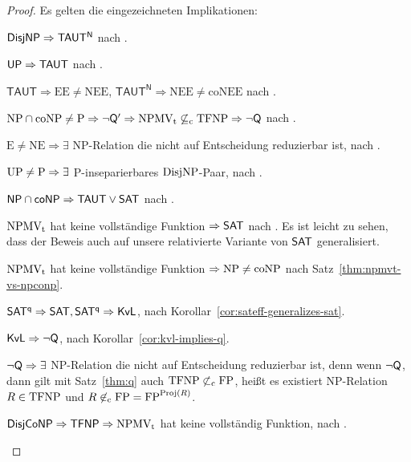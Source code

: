 \begin{proof}
    Es gelten die eingezeichneten Implikationen:
    \begin{Prooflist}[noitemsep,midpenalty=0, label={\arabic*.},labelsep=3pt]
\item $\mathsf{DisjNP} \Rightarrow \mathsf{TAUT^N}$ nach \textcite[Cor.~6.1]{kobler_optimal_2003}.
\item $\mathsf{UP} \Rightarrow \mathsf{TAUT}$ nach \textcite[Cor.~4.1]{kobler_optimal_2003}. %
\item $\mathsf{TAUT}\Rightarrow \mathrm{EE\neq NEE}$, $\mathsf{TAUT^N}\Rightarrow \mathrm{NEE\neq coNEE}$ nach \textcite[Cor.~7.1]{kobler_optimal_2003}.
\item $\mathrm{NP}\cap\mathrm{coNP}\neq \mathrm{P} \Rightarrow \neg\mathsf{Q}' \Rightarrow \mathrm{NPMV_t} \not\subseteq_\mathrm{c} \mathrm{TFNP} \Rightarrow \neg\mathsf{Q}$ nach \textcite[Prop.~9, Thm. 6]{fenner_inverting_2003}.
\item $\mathrm{E\neq NE}\Rightarrow \exists$ NP-Relation die nicht auf Entscheidung reduzierbar ist, nach \textcite{impagliazzo_1991}.
\item $\mathrm{UP}\neq\mathrm{P} \Rightarrow \exists$ P-inseparierbares $\mathrm{DisjNP}$-Paar, nach \textcite[Thm.~5]{grollmann_complexity_1988}.
\item $\mathsf{NP}{}\cap{}\mathsf{coNP}\Rightarrow \mathsf{TAUT}\lor\mathsf{SAT}$ nach \textcite[Cor.~5.1]{kobler_optimal_2003}. %
\item $\mathrm{NPMV_t}$ hat keine vollständige Funktion $\Rightarrow \mathsf{SAT}$ nach \textcite[Thm.~25]{beyersdorff_nondeterministic_2009}. Es ist leicht zu sehen, dass der Beweis auch auf unsere relativierte Variante von $\mathsf{SAT}$ generalisiert.
\item $\mathrm{NPMV_t}$ hat keine vollständige Funktion $\Rightarrow \mathrm{NP}\neq\mathrm{coNP}$ nach Satz~\ref{thm:npmvt-vs-npconp}.
\item $\mathsf{SAT^{q}} \Rightarrow \mathsf{SAT}, \mathsf{SAT^{q}}\Rightarrow \mathsf{KvL}$, nach Korollar~\ref{cor:sateff-generalizes-sat}.
\item $\mathsf{KvL}\Rightarrow\neg\mathsf{Q}$, nach Korollar~\ref{cor:kvl-implies-q}.
\item $\neg\mathsf{Q}\Rightarrow \exists$ NP-Relation die nicht auf Entscheidung reduzierbar ist, denn wenn $\neg\mathsf{Q}$, dann gilt mit Satz~\ref{thm:q} auch $\mathrm{TFNP}\not\subset_\mathrm{c} \mathrm{FP}$, heißt es existiert NP-Relation $R\in\mathrm{TFNP}$ und $R\not\in_\mathrm{c} \mathrm{FP} = \mathrm{FP}^{\operatorname{Proj}(R)}$.
\item $\mathsf{DisjCoNP} \Rightarrow \mathsf{TFNP} \Rightarrow \mathrm{NPMV_t}$ hat keine vollständig Funktion, nach \textcite[Prop.~5.6, 5.10]{pudlak_incompleteness_2017}.

\end{Prooflist}
\end{proof}
